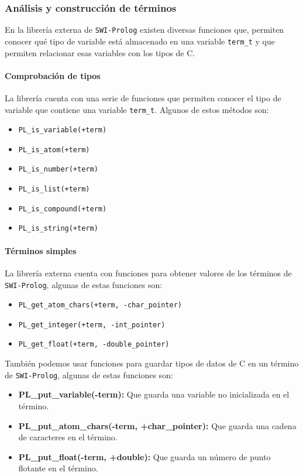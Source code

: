 \documentclass[a4paper]{article}
\begin{document}
\subsubsection{Análisis y construcción de términos}
En la librería externa de \texttt{SWI-Prolog} existen diversas funciones que, permiten conocer qué tipo de variable está almacenado en una variable \texttt{term\_t} y que permiten relacionar esas variables con los tipos de C.
\paragraph{Comprobación de tipos}
La librería cuenta con una serie de funciones que permiten conocer el tipo de variable que contiene una variable \texttt{term\_t}.
Algunos de estos métodos son:
\begin{itemize}
	\item \texttt{PL\_is\_variable(+term)}
	\item \texttt{PL\_is\_atom(+term)}
	\item \texttt{PL\_is\_number(+term)}
	\item \texttt{PL\_is\_list(+term)}
	\item \texttt{PL\_is\_compound(+term)}
	\item \texttt{PL\_is\_string(+term)}
\end{itemize}

\paragraph{Términos simples}
La librería externa cuenta con funciones para obtener valores de los términos de \texttt{SWI-Prolog}, algunas de estas funciones son:
\begin{itemize}
	\item \texttt{PL\_get\_atom\_chars(+term, -char\_pointer)}
	\item \texttt{PL\_get\_integer(+term, -int\_pointer)}
	\item \texttt{PL\_get\_float(+term, -double\_pointer)}
\end{itemize}

También podemos usar funciones para guardar tipos de datos de C en un término de \texttt{SWI-Prolog}, algunas de estas funciones son:

\begin{itemize}
	\item \textbf{PL\_put\_variable(-term):} Que guarda una variable no inicializada en el término.
	\item \textbf{PL\_put\_atom\_chars(-term, +char\_pointer):} Que guarda una cadena de caracteres en el término.
	\item \textbf{PL\_put\_float(-term, +double):} Que guarda un número de punto flotante en el término.
\end{itemize}
\end{document}
